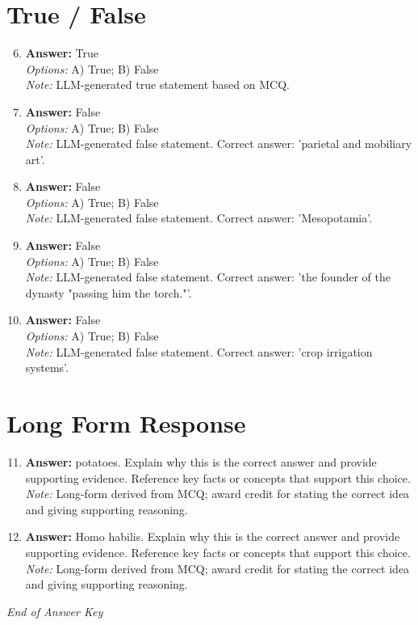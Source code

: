 \documentclass[12pt]{article}
\begin{document}
\section*{True / False}
\begin{enumerate}[label=\arabic*.]
\setcounter{enumi}{5}
\item \textbf{Answer:} True
\\ \textit{Options:} A) True; B) False
\\ \textit{Note:} LLM-generated true statement based on MCQ.
\item \textbf{Answer:} False
\\ \textit{Options:} A) True; B) False
\\ \textit{Note:} LLM-generated false statement. Correct answer: 'parietal and mobiliary art'.
\item \textbf{Answer:} False
\\ \textit{Options:} A) True; B) False
\\ \textit{Note:} LLM-generated false statement. Correct answer: 'Mesopotamia'.
\item \textbf{Answer:} False
\\ \textit{Options:} A) True; B) False
\\ \textit{Note:} LLM-generated false statement. Correct answer: 'the founder of the dynasty "passing him the torch."'.
\item \textbf{Answer:} False
\\ \textit{Options:} A) True; B) False
\\ \textit{Note:} LLM-generated false statement. Correct answer: 'crop irrigation systems'.
\end{enumerate}

\section*{Long Form Response}
\begin{enumerate}[label=\arabic*.]
\setcounter{enumi}{10}
\item \textbf{Answer:} potatoes. Explain why this is the correct answer and provide supporting evidence.
Reference key facts or concepts that support this choice.
\\ \textit{Note:} Long-form derived from MCQ; award credit for stating the correct idea and giving supporting reasoning.
\item \textbf{Answer:} Homo habilis. Explain why this is the correct answer and provide supporting evidence.
Reference key facts or concepts that support this choice.
\\ \textit{Note:} Long-form derived from MCQ; award credit for stating the correct idea and giving supporting reasoning.
\end{enumerate}

\vfill
\noindent\textit{End of Answer Key}
\end{document}
